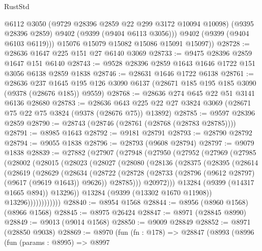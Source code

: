\begin{lexlean}{RustStd}
\begin{coremodule}
            @6112
            @3050
            (@9729 @28396 @2859 @22 @299 @3172 @10094 @10098)
            (@9395 @28396 @2859)
            @9402
            (@9399 (@9404 @6113 @3056)))
          @9402
          (@9399 (@9404 @6103 @6119)))
        @15076
        @15079
        @15082
        @15086
        @15091
        @15097))
@28728 := @28636 @1647 @225 @151 @27 @6140 @3069
@28733 := @9475 @28396 @2859 @1647 @151 @6140
@28743 := @9528 @28396 @2859 @1643 @1646 @1722 @151 @3056 @6138 @2859 @1838
@28746 := @28631 @1646 @1722 @6138
@28761 := @28636
    @237
    @1645
    @195
    @126
    @3090
    @6137
    (@28671 @185 @195 @185 @3090 (@9378 (@28676 @185)) @9559)
@28768 := @28636 @274 @645 @22 @51 @3141 @6136 @28680
@28783 := @28636
    @643
    @225
    @22
    @27
    @3824
    @3069
    (@28671 @75 @22 @75 @3824 (@9378 (@28676 @75)) @13892)
@28785 := @9597 @28396 @2859
@28790 := @28743 (@28746 (@28761 (@28768 (@28783 @28785))))
@28791 := @8985 @1643
@28792 := @9181 @28791
@28793 := @28790 @28792
@28794 := @9055 @1838
@28796 := @28793 (@9608 @28794)
@28797 := @9079 @1838
@28839 := @27882
    (@27907
      (@27948
        (@27950
          (@27952
            (@27969
              (@27985
                (@28002
                  (@28015
                    (@28023
                      (@28027
                        (@28080
                          (@28136
                            (@28375
                              (@28395
                                (@28614
                                  (@28619
                                    (@28629
                                      (@28634
                                        (@28722
                                          (@28728
                                            (@28733
                                              (@28796 (@9612 @28797) (@9617 (@9619 @1643)) @9626))
                                            @28785)))
                                      @20972)))
                                @13284
                                (@9399 (@14317 @1665 @894))
                                @13296))
                            @13284
                            (@9399 (@13302 @1670 @11908))
                            @13296))))))))))))
@28840 := @8954 @1568
@28844 := @8956 (@8960 @1568) (@8966 @1568)
@28845 := @8975 @26424
@28847 := @8971 (@28845 @8990)
@28849 := @9013 (@9014 @1568)
@28850 := @9009 @28849
@28852 := @8971 (@28850 @9038)
@28869 := @8970
    (fun (fn : @178) =>
    @28847
      (@8993
        (@8996
          (fun (params : @8995) =>
          @8997

\end{coremodule}
\end{lexlean}
